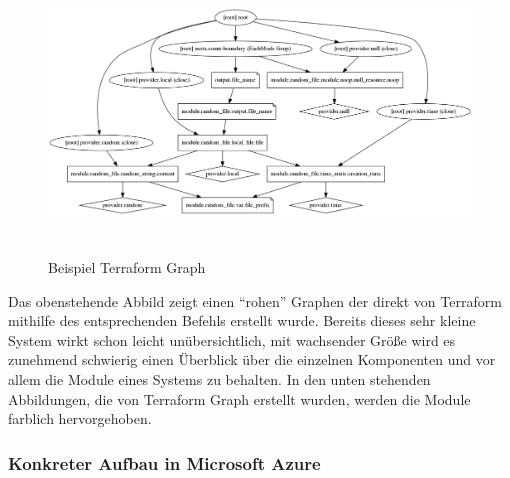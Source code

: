 \begin{spacing}{1.2}
\begin{figure}[H]
  \includegraphics[keepaspectratio, height=7.5cm]{fig/hauptteil/terraform-graph.png}
  \caption{Beispiel Terraform Graph}
  \centering
\end{figure}

Das obenstehende Abbild zeigt einen \enquote{rohen} Graphen der direkt
von Terraform mithilfe des entsprechenden Befehls erstellt wurde.
Bereits dieses sehr kleine System wirkt schon leicht unübersichtlich,
mit wachsender Größe wird es zunehmend schwierig einen Überblick
über die einzelnen Komponenten und vor allem die Module eines Systems
zu behalten. In den unten stehenden Abbildungen, die von Terraform Graph
erstellt wurden, werden die Module farblich hervorgehoben.

\subsubsection{Konkreter Aufbau in Microsoft Azure}

\newpage
\begin{landscape}

\end{landscape}
\end{spacing}
